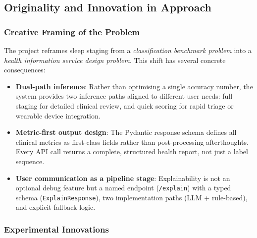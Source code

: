 \documentclass[10pt]{article}
\begin{document}
\subsection{Originality and Innovation in Approach}
\label{sec:originality}

\subsubsection{Creative Framing of the Problem}
\label{sec:creativeFraming}

The project reframes sleep staging from a \textit{classification benchmark problem} into a \textit{health information service design problem}. This shift has several concrete consequences:

\begin{itemize}
  \item \textbf{Dual-path inference}: Rather than optimising a single accuracy number, the system provides two inference paths aligned to different user needs: full staging for detailed clinical review, and quick scoring for rapid triage or wearable device integration.
  \item \textbf{Metric-first output design}: The Pydantic response schema defines all clinical metrics as first-class fields rather than post-processing afterthoughts. Every API call returns a complete, structured health report, not just a label sequence.
  \item \textbf{User communication as a pipeline stage}: Explainability is not an optional debug feature but a named endpoint (\texttt{/explain}) with a typed schema (\texttt{ExplainResponse}), two implementation paths (LLM + rule-based), and explicit fallback logic.
\end{itemize}

\subsubsection{Experimental Innovations}
\label{sec:experimentalInnovations}
\end{document}
